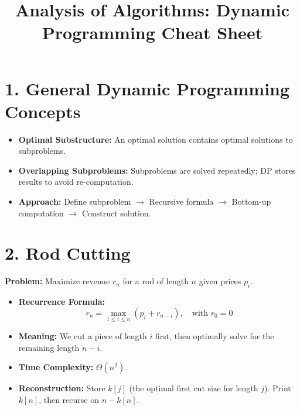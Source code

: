 \documentclass[10pt, a4paper]{article}
\title{\vspace{-20pt} \textbf{Analysis of Algorithms: Dynamic Programming Cheat Sheet}}
\author{}
\date{}
\begin{document}
\maketitle
\vspace{-40pt}

\section*{1. General Dynamic Programming Concepts}
\begin{itemize}
    \item \textbf{Optimal Substructure:} An optimal solution contains optimal solutions to subproblems.
    \item \textbf{Overlapping Subproblems:} Subproblems are solved repeatedly; DP stores results to avoid re-computation.
    \item \textbf{Approach:} Define subproblem $\rightarrow$ Recursive formula $\rightarrow$ Bottom-up computation $\rightarrow$ Construct solution.
\end{itemize}

\hrulefill

\section*{2. Rod Cutting}
\textbf{Problem:} Maximize revenue $r_n$ for a rod of length $n$ given prices $p_i$.
\begin{itemize}
    \item \textbf{Recurrence Formula:}
    \[
    r_n = \max_{1 \le i \le n} (p_i + r_{n-i}), \quad \text{with } r_0 = 0
    \]
    \item \textbf{Meaning:} We cut a piece of length $i$ first, then optimally solve for the remaining length $n-i$.
    \item \textbf{Time Complexity:} $\Theta(n^2)$.
    \item \textbf{Reconstruction:} Store $k[j]$ (the optimal first cut size for length $j$). Print $k[n]$, then recurse on $n - k[n]$.
\end{itemize}

\hrulefill
\end{document}
